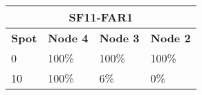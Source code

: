 \begin{tabular}{|l|l|l|l|}
\multicolumn{4}{c}{\textbf{SF11-FAR1}} \\ \hline 
\textbf{Spot} & \textbf{Node 4} & \textbf{Node 3} & \textbf{Node 2} \\ \hline
0 & 100\% & 100\% & 100\% \\ \hline
10 & 100\% & 6\% & 0\% \\ \hline
\end{tabular}
